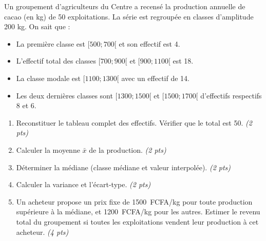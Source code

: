 \documentclass[11pt]{article}
\begin{document}
\begin{exercice}
Un groupement d'agriculteurs du Centre a recensé la production annuelle de cacao (en kg) de \num{50} exploitations. La série est regroupée en classes d'amplitude 200 kg. On sait que :
\begin{itemize}
    \item La première classe est $[500; 700[$ et son effectif est 4.
    \item L'effectif total des classes $[700; 900[$ et $[900; 1100[$ est 18.
    \item La classe modale est $[1100; 1300[$ avec un effectif de 14.
    \item Les deux dernières classes sont $[1300; 1500[$ et $[1500; 1700[$ d'effectifs respectifs 8 et 6.
\end{itemize}

\begin{enumerate}
    \item Reconstituer le tableau complet des effectifs. Vérifier que le total est 50. \textit{(2 pts)}
    \item Calculer la moyenne $\bar{x}$ de la production. \textit{(2 pts)}
    \item Déterminer la médiane (classe médiane et valeur interpolée). \textit{(2 pts)}
    \item Calculer la variance et l'écart-type. \textit{(2 pts)}
    \item Un acheteur propose un prix fixe de \SI{1500}{FCFA/kg} pour toute production supérieure à la médiane, et \SI{1200}{FCFA/kg} pour les autres. Estimer le revenu total du groupement si toutes les exploitations vendent leur production à cet acheteur. \textit{(4 pts)}
\end{enumerate}
\end{exercice}
\end{document}
